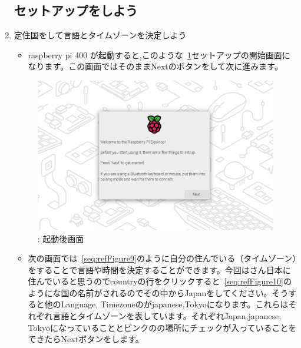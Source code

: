 \documentclass[a4paper,12pt]{jarticle}
\begin{document}
\begin{enumerate}
  \subsection{\theExercise  セットアップをしよう}
  \item  定住国をして言語とタイムゾーンを決定しよう
        \begin{itemize}
          \item
                raspberry pi 400 が起動すると,このような~\ref{seq:refFigure8}セットアップの開始画面になります。この画面ではそのままNextのボタンをして次に進みます。
        \end{itemize}
        \begin{figure}[h]
          \centering
          \begin{minipage}{0.5\textwidth}
          {\upshape
            \includegraphics[width=0.9\linewidth]{sw_image01.png}
            \newline
            {\theFigure\label{seq:refFigure8}}:
            起動後画面
          }
        \end{minipage}
        \end{figure}

        \begin{itemize}
          \item
              次の画面では~\ref{seq:refFigure9}のように自分の住んでいる（タイムゾーン）をすることで言語や時間を決定することができます。今回はさん日本に住んでいると思うのでcountryの行をクリックすると~\ref{seq:refFigure10}のようにな国の名前がされるのでその中からJapanをしてください。そうすると他のLanguage, Timezoneのがjapanese,Tokyoになります。これらはそれぞれ言語とタイムゾーンを表しています。それぞれJapan,japanese, Tokyoになっていることとピンクのの場所にチェックが入っていることをできたらNextボタンをします。
              

\end{itemize}
\end{enumerate}
\end{document}

